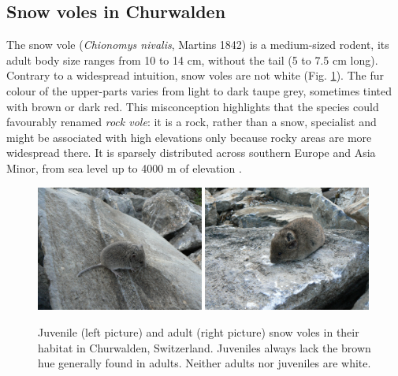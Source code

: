 \subsection{Snow voles in Churwalden}
The snow vole (\textit{Chionomys nivalis}, Martins 1842) is a medium-sized rodent, its adult body size ranges from 10 to 14 cm, without the tail (5 to 7.5 cm long). Contrary to a widespread intuition, snow voles are not white (Fig. \ref{fig:juvvole}). The fur colour of the upper-parts varies from light to dark taupe grey, sometimes tinted with brown or dark red. This misconception highlights that the species could favourably renamed \emph{rock vole}: it is a rock, rather than a snow, specialist \parencite{Luque-larena2002} and might be associated with high elevations only because rocky areas are more widespread there. It is sparsely distributed across southern Europe and Asia Minor, from sea level up to 4000 m of elevation \parencite{Janeau1997}.
\begin{figure}[ht]
	\includegraphics[width=0.49\textwidth]{FiguresGeneral/juvvole.JPG}
	\hspace{0.02\textwidth}
	\includegraphics[width=0.49\textwidth]{FiguresGeneral/advole.JPG}
	\caption{Juvenile (left picture) and adult (right picture) snow voles in their habitat in Churwalden, Switzerland. Juveniles always lack the brown hue generally found in adults. Neither adults nor juveniles are white.}
	\label{fig:juvvole}
\end{figure}

